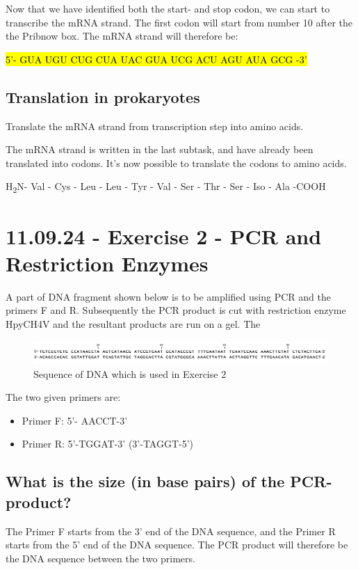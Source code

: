 Now that we have identified both the start- and stop codon, we can start to transcribe the mRNA strand. The first codon will start from number 10 after the the Pribnow box. The mRNA strand will therefore be: 

\hl{5'- GUA UGU CUG CUA UAC GUA UCG ACU AGU AUA GCG -3'}

\subsection{Translation in prokaryotes}
Translate the mRNA strand from transcription step into amino acids.

\vspace{1em}
The mRNA strand is written in the last subtask, and have already been translated into codons. It's now possible to translate the codons to amino acids.

H\textsubscript{2}N- Val - Cys - Leu - Leu - Tyr - Val - Ser - Thr - Ser - Iso - Ala -COOH

\section{11.09.24 - Exercise 2 - PCR and Restriction Enzymes}
A part of DNA fragment shown below is to be amplified using PCR and the primers F and R.  Subsequently the PCR product is cut with restriction enzyme HpyCH4V and the resultant products are run on a gel. The

\begin{figure}[h]
    \centering
    \includegraphics[width=1\textwidth]{Figures/Exc2DNA.png}
    \caption{Sequence of DNA which is used in Exercise 2}
    \label{fig:Exercise2Seq}
\end{figure}

The two given primers are:
\begin{itemize}
    \item Primer F: 5’- AACCT-3’
    \item Primer R: 5’-TGGAT-3’ (3'-TAGGT-5')
\end{itemize}

\subsection{What is the size (in base pairs) of the PCR-product?}
The Primer F starts from the 3' end of the DNA sequence, and the Primer R starts from the 5' end of the DNA sequence. The PCR product will therefore be the DNA sequence between the two primers.

